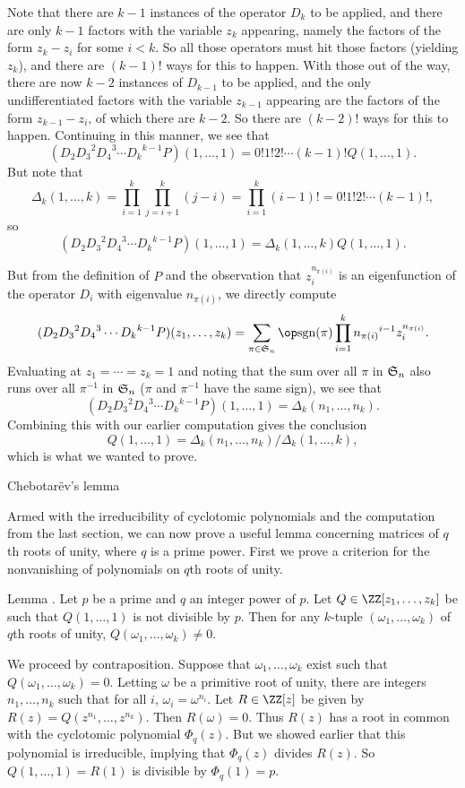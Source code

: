 Note that there are $k-1$ instances of the operator $D_k$ to be applied, and there are only
$k-1$ factors with the variable $z_k$ appearing, namely the
factors of the form $z_k-z_i$ for some $i<k$. So all those operators must hit those factors (yielding
$z_k$), and there are $(k-1)!$ ways for this to happen. With those out of the way, there are now
$k-2$ instances of $D_{k-1}$ to be applied, and the only undifferentiated factors with the variable $z_{k-1}$
appearing are the factors of the form $z_{k-1}-z_i$, of which there are $k-2$. So there are $(k-2)!$
ways for this to happen. Continuing in this manner, we see that
$$(D_2 {D_3}^2 {D_4}^3 \cdots {D_k}^{k-1} P) (1,\ldots,1) = 0!1!2!\cdots(k-1)! Q(1,\ldots,1).$$
But note that
$$\Delta_k(1,\ldots,k) = \prod_{i=1}^k \prod_{j=i+1}^k (j-i) = \prod_{i=1}^k (i-1)!
= 0!1!2!\cdots(k-1)!,$$
so
$$(D_2 {D_3}^2 {D_4}^3 \cdots {D_k}^{k-1} P) (1,\ldots,1) = \Delta_k(1,\ldots,k) Q(1,\ldots,1).$$

But from the definition of $P$ and the observation that $z_i^{n_{\pi(i)}}$ is an eigenfunction
of the operator $D_i$ with eigenvalue $n_{\pi(i)}$, we directly compute
$$(D_2 {D_3}^2 {D_4}^3 \cdots {D_k}^{k-1} P) (z_1,\ldots,z_k) =
\sum_{\pi\in {\frak S}_n} \sgn(\pi) \prod_{i=1}^k {n_{\pi(i)}}^{i-1} z_i^{n_{\pi(i)}}.$$
Evaluating at $z_1=\cdots=z_k = 1$ and noting that the sum over all $\pi$ in ${\frak S}_n$ also
runs over all $\pi^{-1}$ in ${\frak S}_n$ ($\pi$ and $\pi^{-1}$ have the same sign), we see that
$$(D_2 {D_3}^2 {D_4}^3 \cdots {D_k}^{k-1} P) (1,\ldots,1) = \Delta_k(n_1,\ldots,n_k).$$
Combining this with our earlier computation gives the conclusion
$$Q(1,\ldots,1) = \Delta_k(n_1,\ldots,n_k) / \Delta_k(1,\ldots,k) ,$$
which is what we wanted to prove.\slug

\advsect Chebotar\"ev's lemma

Armed with the irreducibility of cyclotomic polynomials and the computation from the last section,
we can now prove a useful lemma concerning matrices of $q$th roots of unity, where $q$ is a prime
power. First we prove
a criterion for the nonvanishing of polynomials on $q$th roots of unity.

\proclaim Lemma \advthm. Let $p$ be a prime and $q$ an integer power of $p$. Let $Q\in \ZZ[z_1,\ldots,z_k]$
be such that $Q(1,\ldots,1)$ is not divisible by $p$. Then for any $k$-tuple $(\omega_1,\ldots,\omega_k)$
of $q$th roots of unity, $Q(\omega_1,\ldots,\omega_k)\ne 0$.

\proof We proceed by contraposition. Suppose that $\omega_1,\ldots,\omega_k$ exist such
that $Q(\omega_1,\ldots,\omega_k) = 0$. Letting $\omega$ be a primitive root of unity, there
are integers $n_1,\ldots,n_k$ such that for all $i$, $\omega_i = \omega^{n_i}$. Let $R\in \ZZ[z]$
be given by $R(z) = Q(z^{n_1},\ldots,z^{n_k})$. Then $R(\omega) = 0$. Thus $R(z)$ has a root in common
with the cyclotomic polynomial $\Phi_q(z)$. But we showed earlier that
this polynomial is irreducible, implying
that $\Phi_q(z)$ divides $R(z)$. So $Q(1,\ldots,1) = R(1)$ is divisible by $\Phi_q(1) = p$.\slug

